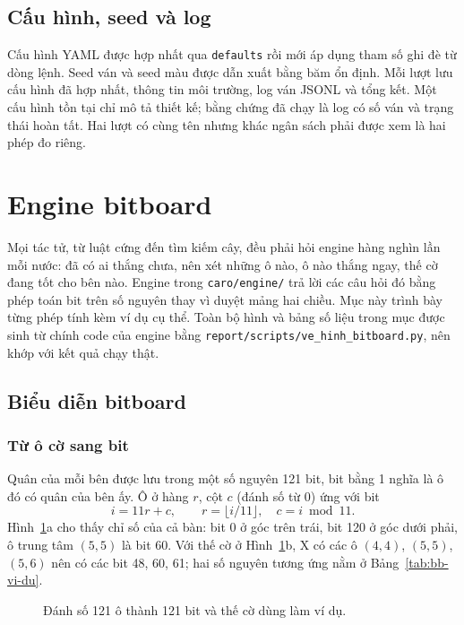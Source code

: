 \subsection{Cấu hình, seed và log}
Cấu hình YAML được hợp nhất qua \texttt{defaults} rồi mới áp dụng tham số ghi đè từ dòng lệnh. Seed ván và seed màu được dẫn xuất bằng băm ổn định. Mỗi lượt lưu cấu hình đã hợp nhất, thông tin môi trường, log ván JSONL và tổng kết. Một cấu hình tồn tại chỉ mô tả thiết kế; bằng chứng đã chạy là log có số ván và trạng thái hoàn tất. Hai lượt có cùng tên nhưng khác ngân sách phải được xem là hai phép đo riêng.

\section{Engine bitboard}
\label{sec:engine}
Mọi tác tử, từ luật cứng đến tìm kiếm cây, đều phải hỏi engine hàng nghìn lần mỗi nước: đã có ai thắng chưa, nên xét những ô nào, ô nào thắng ngay, thế cờ đang tốt cho bên nào. Engine trong \texttt{caro/engine/} trả lời các câu hỏi đó bằng phép toán bit trên số nguyên thay vì duyệt mảng hai chiều. Mục này trình bày từng phép tính kèm ví dụ cụ thể. Toàn bộ hình và bảng số liệu trong mục được sinh từ chính code của engine bằng \texttt{report/scripts/ve\_hinh\_bitboard.py}, nên khớp với kết quả chạy thật.

\subsection{Biểu diễn bitboard}
\label{sec:bb-bieu-dien}

\subsubsection{Từ ô cờ sang bit}
Quân của mỗi bên được lưu trong một số nguyên 121 bit, bit bằng 1 nghĩa là ô đó có quân của bên ấy. Ô ở hàng $r$, cột $c$ (đánh số từ 0) ứng với bit
\begin{equation}
  i = 11r + c, \qquad r = \lfloor i / 11 \rfloor, \quad c = i \bmod 11.
  \label{eq:chi-so}
\end{equation}
Hình~\ref{fig:chi-so}a cho thấy chỉ số của cả bàn: bit 0 ở góc trên trái, bit 120 ở góc dưới phải, ô trung tâm $(5, 5)$ là bit 60. Với thế cờ ở Hình~\ref{fig:chi-so}b, X có các ô $(4,4)$, $(5,5)$, $(5,6)$ nên có các bit 48, 60, 61; hai số nguyên tương ứng nằm ở Bảng~\ref{tab:bb-vi-du}.

\begin{figure}[H]
  \centering
  
  \caption{Đánh số 121 ô thành 121 bit và thế cờ dùng làm ví dụ.}
  \label{fig:chi-so}
\end{figure}

